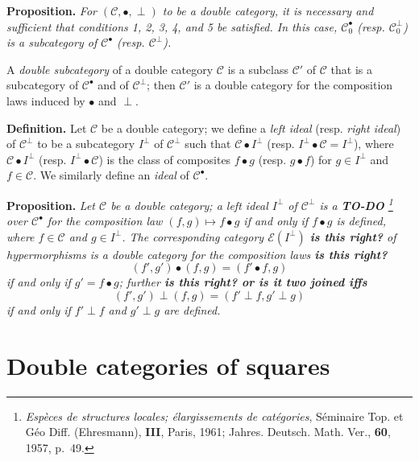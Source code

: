 \documentclass{article}
\newenvironment{itenv}[1]
  {\phantomsection\par\medskip\noindent\textbf{#1.}\itshape}
  {\par\medskip}
\newenvironment{rmenv}[1]
  {\phantomsection\par\medskip\noindent\textbf{#1.}\rmfamily}
  {\par\medskip}
\newcommand{\oldpage}[1]{\marginpar{\footnotesize$\Big\vert$ \textit{p.~#1}}}
\newcommand{\todo}{{\color{purple}\textbf{TO-DO }}}
\newcommand{\unsure}[1]{{\color{purple}\textbf{#1}}}
\newcommand{\CC}{\mathcal{C}}
\begin{document}
\begin{itenv}{Proposition}
  For $(\CC,\bullet,\perp)$ to be a double category, it is necessary and sufficient that conditions 1, 2, 3\textquotesingle, 4\textquotesingle, and 5 be satisfied.
  In this case, $\CC_0^\bullet$ (resp. $\CC_0^\perp$) is a subcategory of $\CC^\bullet$ (resp. $\CC^\perp$).
\end{itenv}

A \emph{double subcategory} of a double category $\CC$ is a subclass $\CC'$ of $\CC$ that is a subcategory of $\CC^\bullet$ and of $\CC^\perp$;
then $\CC'$ is a double category for the composition laws induced by $\bullet$ and $\perp$.

\begin{rmenv}{Definition}
  Let $\CC$ be a double category;
  we define a \emph{left ideal} (resp. \emph{right ideal}) of $\CC^\perp$ to be a subcategory $I^\perp$ of $\CC^\perp$ such that $\CC\bullet I^\perp$ (resp. $I^\perp\bullet\CC=I^\perp$), where $\CC\bullet I^\perp$ (resp. $I^\perp\bullet\CC$) is the class of composites $f\bullet g$ (resp. $g\bullet f$) for $g\in I^\perp$ and $f\in\CC$.
  We similarly define an \emph{ideal} of $\CC^\bullet$.
\end{rmenv}

\oldpage{2}

\begin{itenv}{Proposition}
  Let $\CC$ be a double category;
  a left ideal $I^\perp$ of $\CC^\perp$ is a \todo\footnote{\label{fn1}\emph{Espèces de structures locales; élargissements de catégories}, Séminaire Top. et Géo Diff. (Ehresmann), \textbf{III}, Paris, 1961; Jahres. Deutsch. Math. Ver., \textbf{60}, 1957, p.~49.} over $\CC^\bullet$ for the composition law $(f,g)\mapsto f\bullet g$ if and only if $f\bullet g$ is defined, where $f\in\CC$ and $g\in I^\perp$.
  The corresponding category $\mathcal{E}(I^\perp)$ \unsure{is this right?} of hypermorphisms is a double category for the composition laws \unsure{is this right?}
  \[
    (f',g')\bullet(f,g)
    = (f'\bullet f,g)
  \]
  if and only if $g'=f\bullet g$; further \unsure{is this right? or is it two joined iffs}
  \[
    (f',g')\perp(f,g)
    = (f'\perp f,g'\perp g)
  \]
  if and only if $f'\perp f$ and $g'\perp g$ are defined.
\end{itenv}


\section{Double categories of squares}
\end{document}

